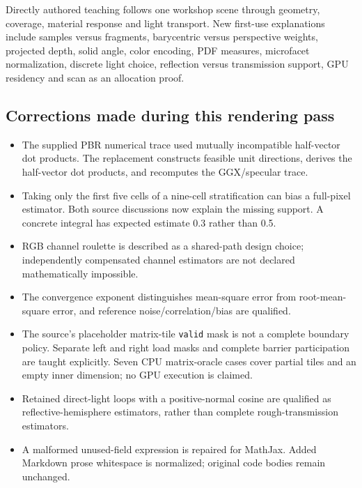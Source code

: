 Directly authored teaching follows one workshop scene through geometry, coverage, material response and light transport. New first-use explanations include samples versus fragments, barycentric versus perspective weights, projected depth, solid angle, color encoding, PDF measures, microfacet normalization, discrete light choice, reflection versus transmission support, GPU residency and scan as an allocation proof.

\subsection{Corrections made during this rendering pass}\label{appendix-3b67654799a2-corrections-made-during-this-rendering-pass}

\begin{itemize}
\tightlist
\item
  The supplied PBR numerical trace used mutually incompatible half-vector dot products. The replacement constructs feasible unit directions, derives the half-vector dot products, and recomputes the GGX/specular trace.
\item
  Taking only the first five cells of a nine-cell stratification can bias a full-pixel estimator. Both source discussions now explain the missing support. A concrete integral has expected estimate 0.3 rather than 0.5.
\item
  RGB channel roulette is described as a shared-path design choice; independently compensated channel estimators are not declared mathematically impossible.
\item
  The convergence exponent distinguishes mean-square error from root-mean-square error, and reference noise/correlation/bias are qualified.
\item
  The source's placeholder matrix-tile \texttt{valid} mask is not a complete boundary policy. Separate left and right load masks and complete barrier participation are taught explicitly. Seven CPU matrix-oracle cases cover partial tiles and an empty inner dimension; no GPU execution is claimed.
\item
  Retained direct-light loops with a positive-normal cosine are qualified as reflective-hemisphere estimators, rather than complete rough-transmission estimators.
\item
  A malformed unused-field expression is repaired for MathJax. Added Markdown prose whitespace is normalized; original code bodies remain unchanged.
\end{itemize}

